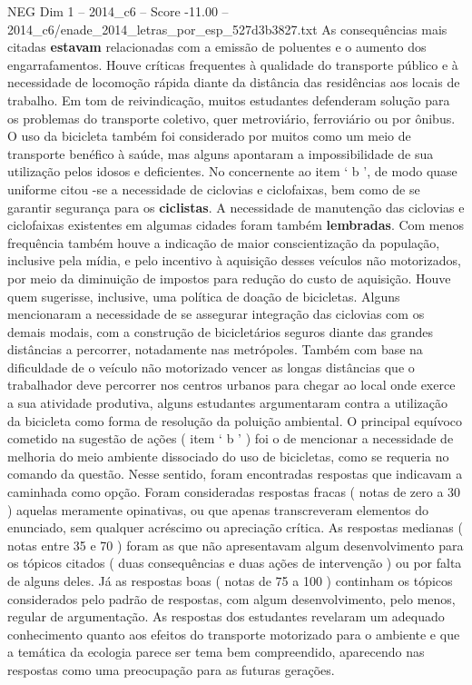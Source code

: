 \begin{textsample}{NEG Dim 1 – 2014\_c6 – Score -11.00 – 2014\_c6/enade\_2014\_letras\_por\_esp\_527d3b3827.txt}
As consequências mais citadas \textbf{estavam} relacionadas com a emissão de poluentes e o aumento dos engarrafamentos.
Houve críticas frequentes à qualidade do transporte público e à necessidade de locomoção rápida diante da distância das residências aos locais de trabalho.
Em tom de reivindicação, muitos estudantes defenderam solução para os problemas do transporte coletivo, quer metroviário, ferroviário ou por ônibus.
O uso da bicicleta também foi considerado por muitos como um meio de transporte benéfico à saúde, mas alguns apontaram a impossibilidade de sua utilização pelos idosos e deficientes.
No concernente ao item ‘ b ’, de modo quase uniforme citou -se a necessidade de ciclovias e ciclofaixas, bem como de se garantir segurança para os \textbf{ciclistas}.
A necessidade de manutenção das ciclovias e ciclofaixas existentes em algumas cidades foram também \textbf{lembradas}.
Com menos frequência também houve a indicação de maior conscientização da população, inclusive pela mídia, e pelo incentivo à aquisição desses veículos não motorizados, por meio da diminuição de impostos para redução do custo de aquisição.
Houve quem sugerisse, inclusive, uma política de doação de bicicletas.
Alguns mencionaram a necessidade de se assegurar integração das ciclovias com os demais modais, com a construção de bicicletários seguros diante das grandes distâncias a percorrer, notadamente nas metrópoles.
Também com base na dificuldade de o veículo não motorizado vencer as longas distâncias que o trabalhador deve percorrer nos centros urbanos para chegar ao local onde exerce a sua atividade produtiva, alguns estudantes argumentaram contra a utilização da bicicleta como forma de resolução da poluição ambiental.
O principal equívoco cometido na sugestão de ações ( item ‘ b ’ ) foi o de mencionar a necessidade de melhoria do meio ambiente dissociado do uso de bicicletas, como se requeria no comando da questão.
Nesse sentido, foram encontradas respostas que indicavam a caminhada como opção.
Foram consideradas respostas fracas ( notas de zero a 30 ) aquelas meramente opinativas, ou que apenas transcreveram elementos do enunciado, sem qualquer acréscimo ou apreciação crítica.
As respostas medianas ( notas entre 35 e 70 ) foram as que não apresentavam algum desenvolvimento para os tópicos citados ( duas consequências e duas ações de intervenção ) ou por falta de alguns deles.
Já as respostas boas ( notas de 75 a 100 ) continham os tópicos considerados pelo padrão de respostas, com algum desenvolvimento, pelo menos, regular de argumentação.
As respostas dos estudantes revelaram um adequado conhecimento quanto aos efeitos do transporte motorizado para o ambiente e que a temática da ecologia parece ser tema bem compreendido, aparecendo nas respostas como uma preocupação para as futuras gerações.

\end{textsample}
